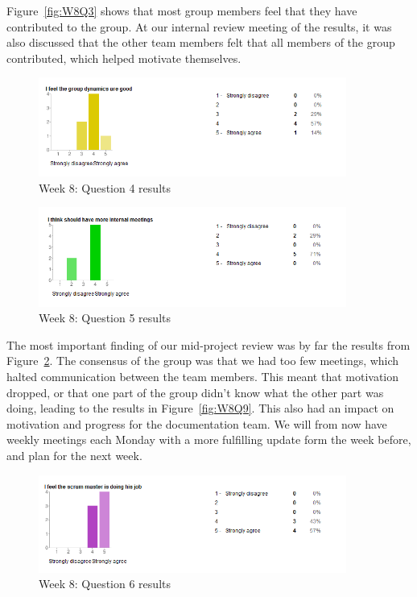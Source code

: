 Figure~\ref{fig:W8Q3} shows that most group members feel that they have contributed to the group. At our internal review meeting of the results, it was also discussed that the other team members felt that all members of the group contributed, which helped motivate themselves. 

\begin{figure}[th!]
\centering
\includegraphics[width=0.9\textwidth]{evaluation/week_8_images/group_dynamics}
\caption{Week 8: Question 4 results}
\label{fig:W8Q4}
\end{figure}

\begin{figure}[th!]
\centering
\includegraphics[width=0.9\textwidth]{evaluation/week_8_images/internal_meetings}
\caption{Week 8: Question 5 results}
\label{fig:W8Q5}
\end{figure}
 The most important finding of our mid-project review was by far the results from Figure~\ref{fig:W8Q5}. The consensus of the group was that we had too few meetings, which halted communication between the team members. This meant that motivation dropped, or that one part of the group didn't know what the other part was doing, leading to the results in Figure~\ref{fig:W8Q9}. This also had an impact on motivation and progress for the documentation team. We will from now have weekly meetings each Monday with a more fulfilling update form the week before, and plan for the next week.

\begin{figure}[th!]
\centering
\includegraphics[width=0.9\textwidth]{evaluation/week_8_images/scrum_master}
\caption{Week 8: Question 6 results}
\label{fig:W8Q6}
\end{figure}

